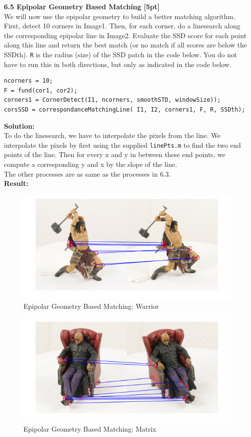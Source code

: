 \documentclass{assignment}
\begin{document}
\begin{problemlist}
\newpage
\textbf{6.5 Epipolar Geometry Based Matching [5pt]}\\
We will now use the epipolar geometry to build a better matching algorithm. First, detect 10 corners in Image1. Then, for each corner, do a linesearch along the corresponding epipolar line in Image2. Evaluate the SSD score for each point along this line and return the best match (or no match if all scores are below the SSDth). \texttt{R} is the radius (size) of the SSD patch in the code below. You do not have to run this in both directions, but only as indicated in the code below.\\
\begin{lstlisting}
ncorners = 10;
F = fund(cor1, cor2);
corners1 = CornerDetect(I1, ncorners, smoothSTD, windowSize));
corsSSD = correspondanceMatchingLine( I1, I2, corners1, F, R, SSDth);
\end{lstlisting}
\textbf{Solution:}\\
To do the linesearch, we have to interpolate the pixels from the line. We interpolate the pixels by first using the supplied \texttt{linePts.m} to find the two end points of the line. Then for every x and y in between these end points, we compute a corresponding y and x by the slope of the line.\\
The other processes are as same as the processes in 6.3.\\
\newpage
\textbf{Result:}
\begin{figure}[!ht]
\centering
\includegraphics[scale = 1.0]{6_5warrior.png}
\caption{Epipolar Geometry Based Matching: Warrior}
\end{figure}

\begin{figure}[!ht]
\centering
\includegraphics[scale = 1.0]{6_5matrix.png}
\caption{Epipolar Geometry Based Matching: Matrix}
\end{figure} 


\end{problemlist}
\end{document}
